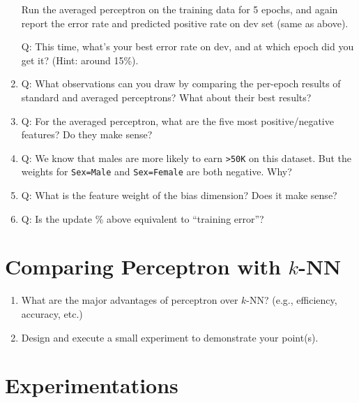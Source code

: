 \documentclass[11pt]{article}
\begin{document}
\begin{enumerate}
%
Run the averaged perceptron on the training data for 5 epochs,
and again report the error rate and predicted positive rate on dev set (same as above).

Q: This time, what's your best error rate on dev, and at which epoch did you get it? (Hint: around 15\%).

\item Q: What observations can you draw by comparing the per-epoch results of standard and averaged perceptrons?
What about their best results?

\item Q: For the averaged perceptron, what are the five most positive/negative features? Do they make sense?

\item Q: We know that males are more likely to earn {\tt >50K} on this dataset.
But the weights for {\tt Sex=Male} and {\tt Sex=Female} are both negative. Why?

\item Q: What is the feature weight of the bias dimension? Does it make sense?

\item Q: Is the update \% above equivalent to ``training error''?

\end{enumerate}


\section{Comparing Perceptron with $k$-NN}

\begin{enumerate}
\item
What are the major advantages of perceptron over $k$-NN? (e.g., efficiency, accuracy, etc.)

\item
Design and execute a small experiment to demonstrate your point(s).
\end{enumerate}

\section{Experimentations}
\end{document}

